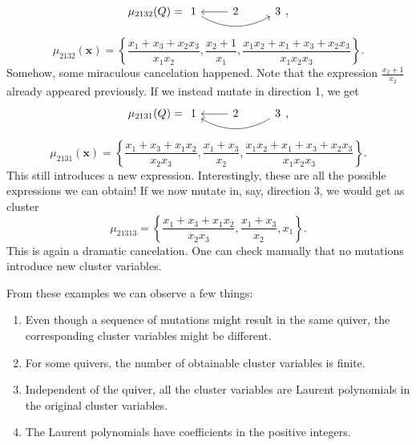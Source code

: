 \documentclass{article}
\newcommand{\bx}{\mathbf{x}}
\begin{document}
\begin{example}
	\begin{equation*}
		\mu_{2132}(Q) =
		\begin{tikzcd}
			1 \rar[leftarrow] \ar[rr, bend right] & 2 & 3
		\end{tikzcd},
	\end{equation*}
	\begin{equation*}
		\mu_{2132}(\bx)= \left\{\frac{x_1 + x_3 + x_2x_3}{x_1x_2}, \frac{x_2 + 1}{x_1}, \frac{x_1 x_2 + x_1 + x_3 + x_2 x_3}{x_1x_2x_3}\right\}.
	\end{equation*}
	Somehow, some miraculous cancelation happened.
	Note that the expression $\frac{x_2 + 1}{x_2}$ already appeared previously.
	If we instead mutate in direction 1, we get
	\begin{equation*}
		\mu_{2131}(Q) =
		\begin{tikzcd}
			1 \rar[leftarrow] \ar[rr,leftarrow, bend right] & 2 & 3
		\end{tikzcd},
	\end{equation*}
	\begin{equation*}
		\mu_{2131}(\bx) = \left\{\frac{x_1 + x_3 + x_1x_2}{x_2x_3}, \frac{x_1 + x_3}{x_2}, \frac{x_1 x_2 + x_1 + x_3 + x_2 x_3}{x_1x_2x_3}\right\}.
	\end{equation*}
	This still introduces a new expression.
	Interestingly, these are all the possible expressions we can obtain!
	If we now mutate in, say, direction 3, we would get as cluster
	\begin{equation*}
		\mu_{21313} = \left\{\frac{x_1 + x_3 + x_1x_2}{x_2x_3}, \frac{x_1 + x_3}{x_2}, x_1 \right\}.
	\end{equation*}
	This is again a dramatic cancelation. One can check manually
	that no mutations introduce new cluster variables.
\end{example}

From these examples we can observe a few things:
\begin{enumerate}
	\item Even though a sequence of mutations might result in the same quiver, the corresponding
	      cluster variables might be different.
	\item For some quivers, the number of obtainable cluster variables is finite.
	\item Independent of the quiver, all the cluster variables are Laurent polynomials in the
	      original cluster variables.
	\item The Laurent polynomials have coefficients in the positive integers.
\end{enumerate}
\end{document}
